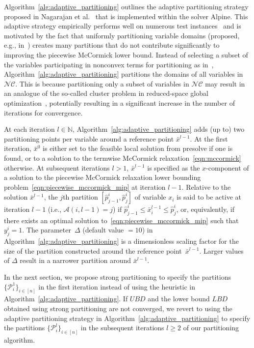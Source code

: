 \documentclass{article}
\newcommand{\pmc}{piecewise McCormick}
\newcommand{\pp}{partitioning points}
\begin{document}
Algorithm~\ref{alg:adaptive_partitioning} outlines the adaptive partitioning strategy proposed in Nagarajan et al.\ \cite{nagarajan2019adaptive} that is implemented within the solver Alpine.
This adaptive strategy empirically performs well on numerous test instances~\cite{nagarajan2019adaptive} and is motivated by the fact that uniformly partitioning variable domains (proposed, e.g., in~\cite{castro2016normalized,saif2008global,wicaksono2008piecewise}) creates many partitions that do not contribute significantly to improving the piecewise McCormick lower bound. 
Instead of selecting a subset of the variables participating in nonconvex terms for partitioning as in~\cite{nagarajan2019adaptive}, Algorithm~\ref{alg:adaptive_partitioning} partitions the domains of all variables in $\mathcal{NC}$.
This is because partitioning only a subset of variables in $\mathcal{NC}$ may result in an analogue of the so-called cluster problem in reduced-space global optimization~\cite{kannan2017cluster,kannan2018convergence}, potentially resulting in a significant increase in the number of iterations for convergence.


At each iteration $l \in \mathbb{N}$, Algorithm~\ref{alg:adaptive_partitioning} adds (up to) two {\pp} per variable around a reference point $\bar{x}^{l-1}$.
At the first iteration, $\bar{x}^0$ is either set to the feasible local solution from presolve if one is found, or to a solution to the termwise McCormick relaxation~\eqref{eqn:mccormick} otherwise.
At subsequent iterations $l > 1$, $\bar{x}^{l-1}$ is specified as the $x$-component of a solution to the {\pmc} relaxation lower bounding problem~\eqref{eqn:piecewise_mccormick_mip} at iteration $l-1$.
Relative to the solution $\bar{x}^{l-1}$, the $j$th partition $[\hat{p}^i_{j-1}, \hat{p}^i_j]$ of variable $x_i$ is said to be active at iteration $l-1$ (i.e., $\mathcal{A}(i,l-1) = j$) if $\hat{p}^i_{j-1} \leq \bar{x}^{l-1}_i \leq \hat{p}^i_j$, or, equivalently, if there exists an optimal solution to~\eqref{eqn:piecewise_mccormick_mip} such that $y^i_j = 1$.
The parameter~$\Delta$ (default value $= 10$) in Algorithm~\ref{alg:adaptive_partitioning} is a dimensionless scaling factor for the size of the partition constructed around the reference point~$\bar{x}^{l-1}$.
Larger values of $\Delta$ result in a narrower partition around $\bar{x}^{l-1}$.



In the next section, we propose strong partitioning to specify the partitions $\{\mathcal{P}^1_i\}_{i \in [n]}$ in the first iteration instead of using the heuristic in Algorithm~\ref{alg:adaptive_partitioning}.
If $UBD$ and the lower bound $LBD$ obtained using strong partitioning are not converged, we revert to using the adaptive partitioning strategy in Algorithm~\ref{alg:adaptive_partitioning} to specify the partitions $\{\mathcal{P}^l_i\}_{i \in [n]}$ in the subsequent iterations $l \geq 2$ of our partitioning algorithm.
\end{document}
